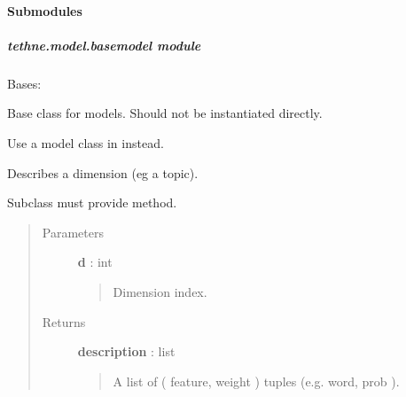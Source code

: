 \documentclass[letterpaper,10pt,english]{sphinxmanual}
\begin{document}
\paragraph{Submodules}
\label{tethne.model:submodules}

\subparagraph{tethne.model.basemodel module}
\label{tethne.model.basemodel:module-tethne.model.basemodel}\label{tethne.model.basemodel::doc}\label{tethne.model.basemodel:tethne-model-basemodel-module}

\begin{fulllineitems}
\label{tethne.model.basemodel:tethne.model.basemodel.BaseModel}
Bases: 

Base class for models. Should not be instantiated directly.

Use a model class in {\hyperref[tethne.model:module-tethne.model]{}} instead.

\begin{fulllineitems}
\label{tethne.model.basemodel:tethne.model.basemodel.BaseModel.dimension}
Describes a dimension (eg a topic).

Subclass must provide  method.
\begin{quote}\begin{description}
\item[{Parameters}] \leavevmode
\textbf{d} : int
\begin{quote}

Dimension index.
\end{quote}

\item[{Returns}] \leavevmode
\textbf{description} : list
\begin{quote}

A list of ( feature, weight ) tuples (e.g. word, prob ).
\end{quote}

\end{description}\end{quote}

\end{fulllineitems}


\end{fulllineitems}
\end{document}
